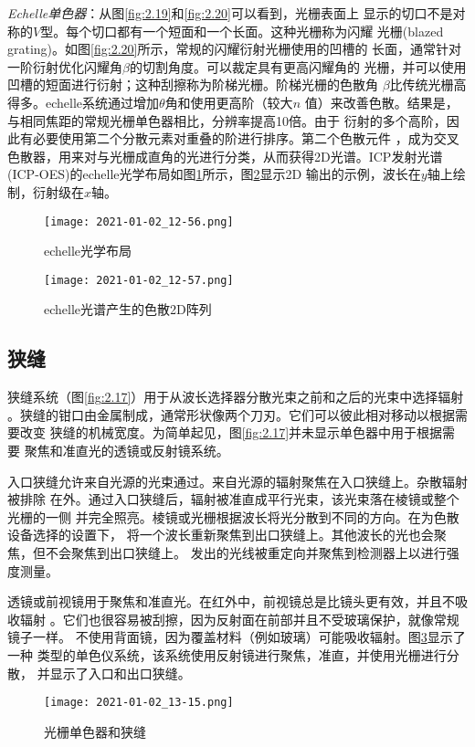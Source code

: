 \emph{Echelle单色器}：从图\ref{fig:2.19}和\ref{fig:2.20}可以看到，光栅表面上
显示的切口不是对称的$V$型。每个切口都有一个短面和一个长面。这种光栅称为闪耀
光栅(blazed grating)。如图\ref{fig:2.20}所示，常规的闪耀衍射光栅使用的凹槽的
长面，通常针对一阶衍射优化闪耀角$\beta$的切割角度。可以裁定具有更高闪耀角的
光栅，并可以使用凹槽的短面进行衍射；这种刮擦称为阶梯光栅。阶梯光栅的色散角
$\beta$比传统光栅高得多。echelle系统通过增加$\theta$角和使用更高阶（较大$n$
值）来改善色散。结果是，与相同焦距的常规光栅单色器相比，分辨率提高10倍。由于
衍射的多个高阶，因此有必要使用第二个分散元素对重叠的阶进行排序。第二个色散元件
，成为交叉色散器，用来对与光栅成直角的光进行分类，从而获得2D光谱。ICP发射光谱
(ICP-OES)的echelle光学布局如图\ref{fig:2.27}所示，图\ref{fig:2.28}显示2D
输出的示例，波长在$y$轴上绘制，衍射级在$x$轴。
\begin{figure}[htpb]
    \centering
    \texttt{[image: 2021-01-02\_12-56.png]}
    \caption{echelle光学布局}
    \label{fig:2.27}
\end{figure}
\begin{figure}[htpb]
    \centering
    \texttt{[image: 2021-01-02\_12-57.png]}
    \caption{echelle光谱产生的色散2D阵列}
    \label{fig:2.28}
\end{figure}

\subsection{狭缝}
狭缝系统（图\ref{fig:2.17}）用于从波长选择器分散光束之前和之后的光束中选择辐射
。狭缝的钳口由金属制成，通常形状像两个刀刃。它们可以彼此相对移动以根据需要改变
狭缝的机械宽度。为简单起见，图\ref{fig:2.17}并未显示单色器中用于根据需要
聚焦和准直光的透镜或反射镜系统。

入口狭缝允许来自光源的光束通过。来自光源的辐射聚焦在入口狭缝上。杂散辐射被排除
在外。通过入口狭缝后，辐射被准直成平行光束，该光束落在棱镜或整个光栅的一侧
并完全照亮。棱镜或光栅根据波长将光分散到不同的方向。在为色散设备选择的设置下，
将一个波长重新聚焦到出口狭缝上。其他波长的光也会聚焦，但不会聚焦到出口狭缝上。
发出的光线被重定向并聚焦到检测器上以进行强度测量。

透镜或前视镜用于聚焦和准直光。在红外中，前视镜总是比镜头更有效，并且不吸收辐射
。它们也很容易被刮擦，因为反射面在前部并且不受玻璃保护，就像常规镜子一样。
不使用背面镜，因为覆盖材料（例如玻璃）可能吸收辐射。图\ref{fig:2.29}显示了一种
类型的单色仪系统，该系统使用反射镜进行聚焦，准直，并使用光栅进行分散，
并显示了入口和出口狭缝。
\begin{figure}[htpb]
    \centering
    \texttt{[image: 2021-01-02\_13-15.png]}
    \caption{光栅单色器和狭缝}
    \label{fig:2.29}
\end{figure}

